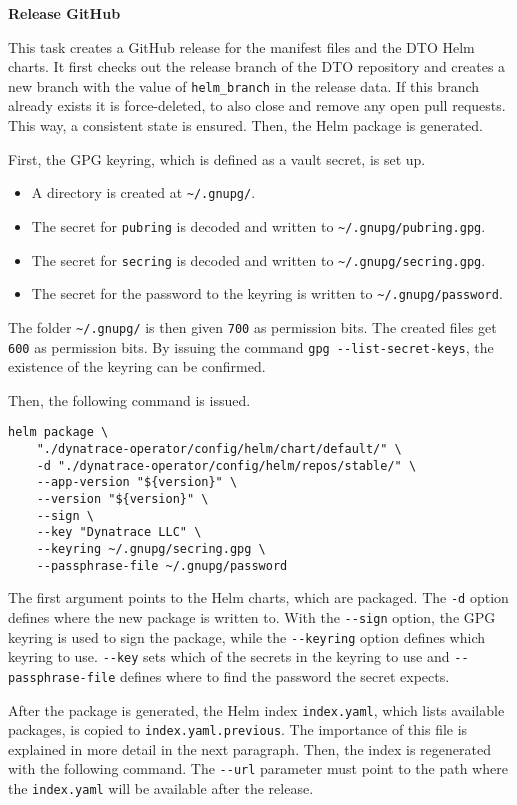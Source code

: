 \textbf{Release GitHub}

This task creates a GitHub release for the manifest files and the DTO Helm charts.
It first checks out the release branch of the DTO repository and creates a new branch with the value of \verb|helm_branch| in the release data.
If this branch already exists it is force-deleted, to also close and remove any open pull requests.
This way, a consistent state is ensured.
Then, the Helm package is generated.

\pagebreak

First, the GPG keyring, which is defined as a vault secret, is set up.
\begin{itemize}
    \item A directory is created at \verb|~/.gnupg/|.
    \item The secret for \verb|pubring| is decoded and written to \verb|~/.gnupg/pubring.gpg|.
    \item The secret for \verb|secring| is decoded and written to \verb|~/.gnupg/secring.gpg|.
    \item The secret for the password to the keyring is written to \verb|~/.gnupg/password|.
\end{itemize}

The folder \verb|~/.gnupg/| is then given \verb|700| as permission bits.
The created files get \verb|600| as permission bits.
By issuing the command \verb|gpg --list-secret-keys|, the existence of the keyring can be confirmed.

Then, the following command is issued.
\begin{verbatim}
helm package \
    "./dynatrace-operator/config/helm/chart/default/" \
    -d "./dynatrace-operator/config/helm/repos/stable/" \
    --app-version "${version}" \
    --version "${version}" \
    --sign \
    --key "Dynatrace LLC" \
    --keyring ~/.gnupg/secring.gpg \
    --passphrase-file ~/.gnupg/password
\end{verbatim}

The first argument points to the Helm charts, which are packaged.
The \verb|-d| option defines where the new package is written to.
With the \verb|--sign| option, the GPG keyring is used to sign the package, while the \verb|--keyring| option defines which keyring to use.
\verb|--key| sets which of the secrets in the keyring to use and \verb|--passphrase-file| defines where to find the password the secret expects.

After the package is generated, the Helm index \verb|index.yaml|, which lists available packages, is copied to \verb|index.yaml.previous|.
The importance of this file is explained in more detail in the next paragraph.
Then, the index is regenerated with the following command.
The \verb|--url| parameter must point to the path where the \verb|index.yaml| will be available after the release.

